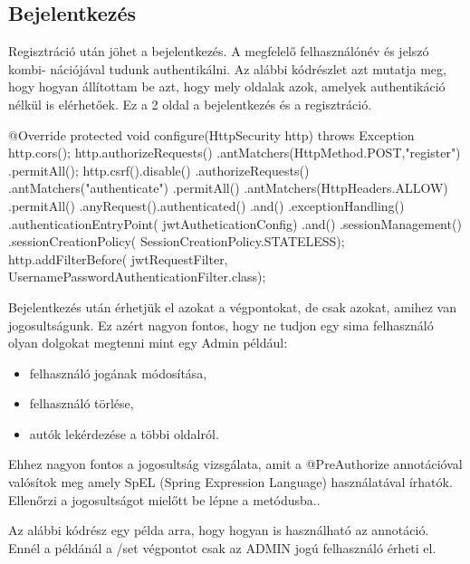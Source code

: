 \subsection{Bejelentkezés}

Regisztráció után jöhet a bejelentkezés. A megfelelő felhasználónév és jelszó kombi-
nációjával tudunk authentikálni. Az alábbi kódrészlet azt mutatja meg, hogy hogyan állítottam be azt, hogy mely oldalak azok, amelyek authentikáció nélkül is elérhetőek. Ez a 2 oldal a bejelentkezés és a regisztráció.

\begin{java}
    @Override
    protected void configure(HttpSecurity http)
     throws Exception{
        http.cors();
        http.authorizeRequests()
        .antMatchers(HttpMethod.POST,"register")
        .permitAll();
        http.csrf().disable()
          .authorizeRequests()
          .antMatchers("authenticate")
          .permitAll()
          .antMatchers(HttpHeaders.ALLOW)
          .permitAll()
          .anyRequest().authenticated()
          .and()
          .exceptionHandling()
          .authenticationEntryPoint(
           jwtAutheticationConfig)
          .and()
          .sessionManagement()
          .sessionCreationPolicy(
          SessionCreationPolicy.STATELESS);
          http.addFilterBefore(
          jwtRequestFilter,
      UsernamePasswordAuthenticationFilter.class);
}
\end{java}

Bejelentkezés után érhetjük el azokat a végpontokat, de csak azokat, amihez van jogosultságunk. Ez azért nagyon fontos, hogy ne tudjon egy sima felhasználó olyan dolgokat megtenni mint egy Admin például:

\begin{itemize}
\item felhasználó jogának módosítása,
\item felhasználó törlése,
\item autók lekérdezése a többi oldalról.
\end{itemize}

Ehhez nagyon fontos a jogosultság vizsgálata, amit a @PreAuthorize annotációval valósítok meg amely SpEL (Spring Expression Language) használatával írhatók. Ellenőrzi a jogosultságot mielőtt be lépne a metódusba.\cite{SpringSecurity}.

Az alábbi kódrész egy példa arra, hogy hogyan is használható az annotáció. Ennél a példánál a /set végpontot csak az ADMIN jogú felhasználó érheti el.

